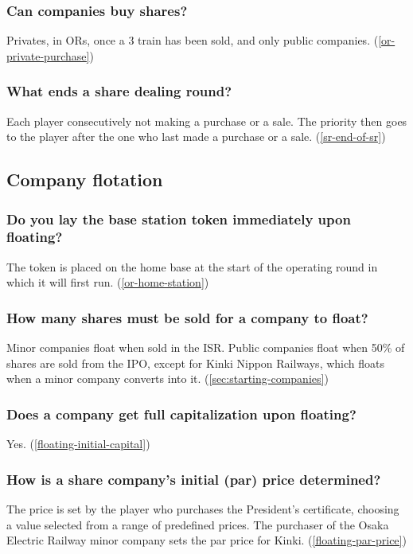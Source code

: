\subsubsection{Can companies buy shares?}
Privates, in ORs, once a 3 train has been sold, and only public
companies. (\autoref{or-private-purchase})

\subsubsection{What ends a share dealing round?}
Each player consecutively not making a purchase or a sale. The
priority then goes to the player after the one who last made a
purchase or a sale. (\autoref{sr-end-of-sr})

\subsection{Company flotation}

\subsubsection{Do you lay the base station token immediately upon floating?}
The token is placed on the home base at the start of the operating
round in which it will first run. (\autoref{or-home-station})

\subsubsection{How many shares must be sold for a company to float?}
Minor companies float when sold in the ISR. Public companies float
when 50\% of shares are sold from the IPO, except for Kinki Nippon
Railways, which floats when a minor company converts into
it. (\autoref{sec:starting-companies})

\subsubsection{Does a company get full capitalization upon floating?}
Yes. (\autoref{floating-initial-capital})

\subsubsection{How is a share company's initial (par) price determined?}
The price is set by the player who purchases the President's
certificate, choosing a value selected from a range of predefined
prices. The purchaser of the Osaka Electric Railway minor company sets
the par price for Kinki. (\autoref{floating-par-price})

